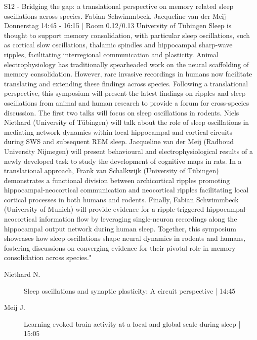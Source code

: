 
            \begin{symposium}
            {S12 - Bridging the gap: a translational perspective on memory related sleep oscillations across species.}
            {Fabian Schwimmbeck, Jacqueline van der Meij}
            {Donnerstag 14:45 - 16:15 | Room 0.12/0.13}
            {University of Tübingen}
            Sleep is thought to support memory consolidation, with particular sleep oscillations, such as cortical slow oscillations, thalamic spindles and hippocampal sharp-wave ripples, facilitating interregional communication and plasticity. Animal electrophysiology has traditionally spearheaded work on the neural scaffolding of memory consolidation. However, rare invasive recordings in humans now facilitate translating and extending these findings across species.
Following a translational perspective, this symposium will present the latest findings on ripples and sleep oscillations from animal and human research to provide a forum for cross-species discussion.
The first two talks will focus on sleep oscillations in rodents. Niels Niethard (University of Tübingen) will talk about the role of sleep oscillations in mediating network dynamics within local hippocampal and cortical circuits during SWS and subsequent REM sleep.
Jacqueline van der Meij (Radboud University Nijmegen) will present behavioural and electrophysiological results of a newly developed task to study the development of cognitive maps in rats.
In a translational approach, Frank van Schalkwijk (University of Tübingen) demonstrates a functional division between archicortical ripples promoting hippocampal-neocortical communication and neocortical ripples facilitating local cortical processes in both humans and rodents.
Finally, Fabian Schwimmbeck (University of Munich) will provide evidence for a ripple-triggered hippocampal-neocortical information flow by leveraging single-neuron recordings along the hippocampal output network during human sleep.
Together, this symposium showcases how sleep oscillations shape neural dynamics in rodents and humans, fostering discussions on converging evidence for their pivotal role in memory consolidation across species."
            \begin{description}    
            
                \item [ Niethard N.] Sleep oscillations and synaptic plasticity: A circuit perspective \textcolor{mygray}{ | 14:45}    
                
                \item [ Meij J.] Learning evoked brain activity at a local and global scale during sleep \textcolor{mygray}{ | 15:05}    
                

\end{description}
\end{symposium}
